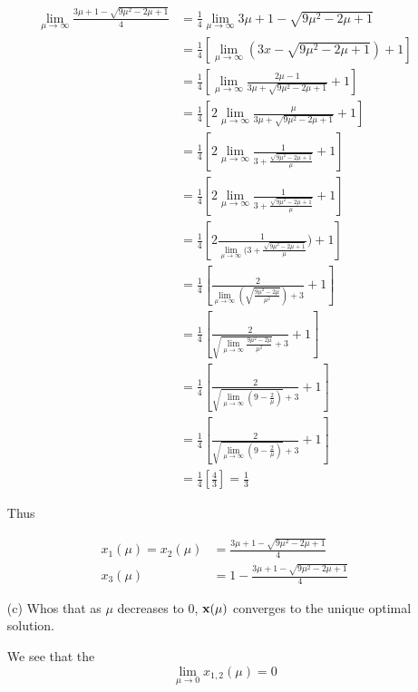 \documentclass[answers]{exam} %
\newcommand\x{{\bf x}}
\begin{document}
\begin{itemize}
\begin{framed}
\begin{equation*}
\begin{aligned}
\lim_{\mu \to \infty} \frac{3 \mu + 1 -  \sqrt{9\mu^2 -2  \mu + 1}} { 4} &= \frac{1}{4}\lim_{\mu \to \infty} 3 \mu + 1 -  \sqrt{9\mu^2 -2  \mu + 1} \\ 
&= \frac{1}{4}[ \lim_{\mu \to \infty} (3x -  \sqrt{9\mu^2 -2  \mu + 1}) + 1] \\ 
&= \frac{1}{4}[\lim_{\mu \to \infty} \frac{2 \mu -1}{3 \mu   +  \sqrt{9\mu^2 -2  \mu + 1}} + 1] \\ 
&= \frac{1}{4}[ 2 \lim_{\mu \to \infty} \frac{\mu}{3 \mu   +  \sqrt{9\mu^2 -2  \mu + 1}} + 1] \\ 
&= \frac{1}{4}[ 2 \lim_{\mu \to \infty} \frac{1}{3    +  \frac{\sqrt{9\mu^2 -2  \mu + 1}}{\mu}} + 1] \\ 
&= \frac{1}{4}[ 2 \lim_{\mu \to \infty} \frac{1}{3    +  \frac{\sqrt{9\mu^2 -2  \mu + 1}}{\mu}} + 1] \\ 
&= \frac{1}{4}[ 2  \frac{1}{ \lim_{\mu \to \infty} (3    +  \frac{\sqrt{9\mu^2 -2  \mu + 1}}{\mu}}) + 1] \\ 
&= \frac{1}{4}[   \frac{2}{ \lim_{\mu \to \infty} ( \sqrt{ \frac{9\mu^2 -2  \mu}{\mu^2}}) + 3} + 1] \\ 
&= \frac{1}{4}[   \frac{2}{ \sqrt{\lim_{\mu \to \infty}  \frac{9\mu^2 -2  \mu}{\mu^2}}  + 3}  + 1] \\ 
&= \frac{1}{4}[   \frac{2}{ \sqrt{\lim_{\mu \to \infty} (9 - \frac{2}{\mu})}  + 3}  + 1] \\ 
&= \frac{1}{4}[   \frac{2}{ \sqrt{\lim_{\mu \to \infty} (9 - \frac{2}{\mu})}  + 3}  + 1] \\ 
&= \frac{1}{4}[   \frac{4}{3}]  = \frac{1}{3}
\end{aligned}
\end{equation*}

Thus 

\begin{equation*}
\begin{aligned}
x_1(\mu) = x_2(\mu) &= \frac{3 \mu + 1 -  \sqrt{9\mu^2 -2  \mu + 1}} { 4} \\ 
x_3 (\mu) &= 1 - \frac{3 \mu + 1 -  \sqrt{9\mu^2 -2  \mu + 1}} { 4}
\end{aligned}
\end{equation*}
\end{framed}
\item[(c)] Whos that as $\mu$ decreases to $0$, $ \x(\mu)$ converges to the unique optimal solution. 
\begin{framed}
We see that the 
\[
\lim_{\mu \to 0} x_{1,2}(\mu) = 0
\]


\end{framed}
\end{itemize}
\end{document}
